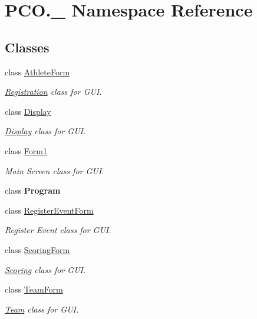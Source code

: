 \hypertarget{namespacePCO_1_1__0}{}\section{P\+C\+O.\+\_ Namespace Reference}
\label{namespacePCO_1_1__0}
\subsection*{Classes}
\begin{DoxyCompactItemize}
\item 
class \hyperlink{classPCO_1_1__0_1_1AthleteForm}{Athlete\+Form}
\begin{DoxyCompactList}\small\item\em \hyperlink{classRegistration}{Registration} class for G\+UI. \end{DoxyCompactList}\item 
class \hyperlink{classPCO_1_1__0_1_1Display}{Display}
\begin{DoxyCompactList}\small\item\em \hyperlink{classPCO_1_1__0_1_1Display}{Display} class for G\+UI. \end{DoxyCompactList}\item 
class \hyperlink{classPCO_1_1__0_1_1Form1}{Form1}
\begin{DoxyCompactList}\small\item\em Main Screen class for G\+UI. \end{DoxyCompactList}\item 
class {\bfseries Program}
\item 
class \hyperlink{classPCO_1_1__0_1_1RegisterEventForm}{Register\+Event\+Form}
\begin{DoxyCompactList}\small\item\em Register Event class for G\+UI. \end{DoxyCompactList}\item 
class \hyperlink{classPCO_1_1__0_1_1ScoringForm}{Scoring\+Form}
\begin{DoxyCompactList}\small\item\em \hyperlink{classScoring}{Scoring} class for G\+UI. \end{DoxyCompactList}\item 
class \hyperlink{classPCO_1_1__0_1_1TeamForm}{Team\+Form}
\begin{DoxyCompactList}\small\item\em \hyperlink{classTeam}{Team} class for G\+UI. \end{DoxyCompactList}\end{DoxyCompactItemize}
